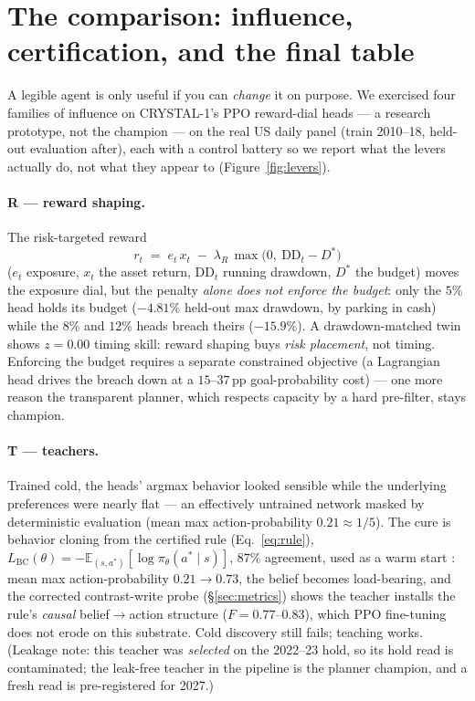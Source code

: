 \documentclass[11pt]{article}
\newcommand{\E}{\mathbb{E}}
\begin{document}
\section{The comparison: influence, certification, and the final table}
\label{sec:compare}

A legible agent is only useful if you can \emph{change} it on purpose. We exercised four
families of influence on CRYSTAL-1's PPO reward-dial heads --- a research prototype, not the
champion --- on the real US daily panel (train 2010--18, held-out evaluation after), each with
a control battery so we report what the levers actually do, not what they appear to
(Figure~\ref{fig:levers}).

\paragraph{R --- reward shaping.} The risk-targeted reward
\begin{equation}
r_t \;=\; e_t\, x_t \;-\; \lambda_{R}\,\max\big(0,\ \text{DD}_t - D^{*}\big)
\label{eq:reward}
\end{equation}
($e_t$ exposure, $x_t$ the asset return, $\text{DD}_t$ running drawdown, $D^{*}$ the budget)
moves the exposure dial, but the penalty \emph{alone does not enforce the budget}: only the
$5\%$ head holds its budget ($-4.81\%$ held-out max drawdown, by parking in cash) while the
$8\%$ and $12\%$ heads breach theirs ($-15.9\%$). A drawdown-matched twin shows $z = 0.00$
timing skill: reward shaping buys \emph{risk placement}, not timing. Enforcing the budget
requires a separate constrained objective (a Lagrangian head drives the breach down at a
$15$--$37$\,pp goal-probability cost) --- one more reason the transparent planner, which
respects capacity by a hard pre-filter, stays champion.

\paragraph{T --- teachers.} Trained cold, the heads' argmax behavior looked sensible while the
underlying preferences were nearly flat --- an effectively untrained network masked by
deterministic evaluation (mean max action-probability $0.21 \approx 1/5$). The cure is behavior
cloning from the certified rule (Eq.~\ref{eq:rule}),
$L_{\text{BC}}(\theta) = -\E_{(s,a^{*})}[\log \pi_\theta(a^{*}\mid s)]$, $87\%$ agreement, used
as a warm start \citep{ross2011dagger,rusu2016distillation}: mean max action-probability
$0.21 \to 0.73$, the belief becomes load-bearing, and the corrected contrast-write probe
(\S\ref{sec:metrics}) shows the teacher installs the rule's \emph{causal} belief$\to$action
structure ($F = 0.77$--$0.83$), which PPO fine-tuning does not erode on this substrate. Cold
discovery still fails; teaching works. (Leakage note: this teacher was \emph{selected} on the
2022--23 hold, so its hold read is contaminated; the leak-free teacher in the pipeline is the
planner champion, and a fresh read is pre-registered for 2027.)
\end{document}
